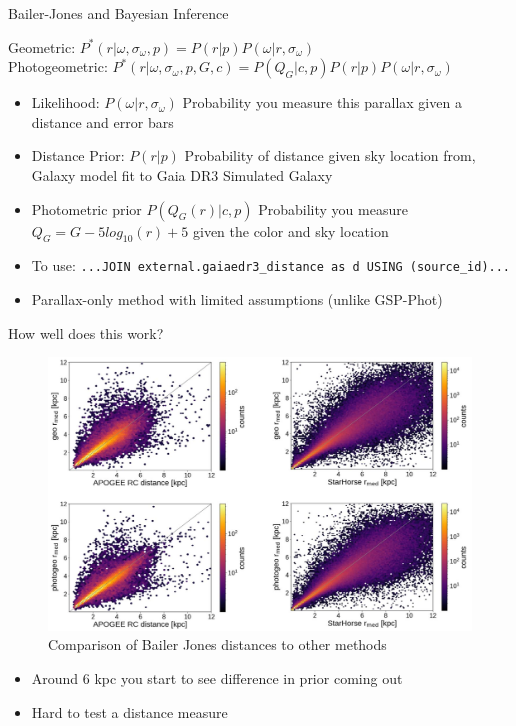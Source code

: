 \documentclass[hyperref={colorlinks = true, linkcolor=blue},8pt]{beamer}
\begin{document}
\begin{frame}{Bailer-Jones and Bayesian Inference}

\Large

Geometric: $P^*(r | \omega, \sigma_\omega, p) = P(r | p) P(\omega | r, \sigma_\omega)  $\\
\vspace{10pt}
Photogeometric: $P^*(r | \omega, \sigma_\omega, p, G, c) = P(Q_G | c, p) P(r | p) P(\omega | r, \sigma_\omega) $

\vspace{10pt}
\normalsize
\begin{itemize}
\item Likelihood: $P(\omega | r, \sigma_\omega)$ Probability you measure this parallax given a distance and error bars
\item Distance Prior: $P(r | p)$ Probability of distance given sky location from, Galaxy model fit to Gaia DR3 Simulated Galaxy\cite{bailer-jonesEstimating2021}\
\item Photometric prior $P(Q_G(r) | c, p)$ Probability you measure $Q_G = G - 5 log_10(r) + 5$ given the color and sky location\cite{bailer-jonesEstimating2021}\
\item To use: \texttt{...JOIN external.gaiaedr3\_distance as d USING (source\_id)...}
\item Parallax-only method with limited assumptions (unlike GSP-Phot)
\end{itemize}


\end{frame}

\begin{frame}{How well does this work?}
		\begin{figure}
			\includegraphics[width=0.8\columnwidth]{bailerjonesverification.png}
			\caption{Comparison of Bailer Jones distances to other methods \cite{bailer-jonesEstimating2021}}
		\end{figure}
		\begin{itemize}
			\item Around 6 kpc you start to see difference in prior coming out
			\item Hard to test a distance measure
		\end{itemize}
\end{frame}
\end{document}
